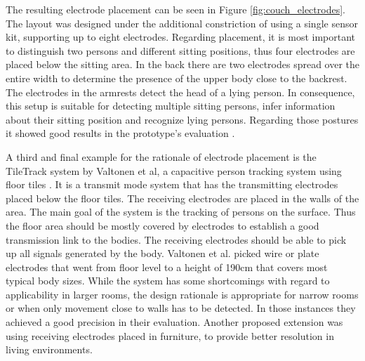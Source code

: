 The resulting electrode placement can be seen in Figure \ref{fig:couch_electrodes}. The layout was designed under the additional constriction of using a single sensor kit, supporting up to eight electrodes. Regarding placement, it is most important to distinguish two persons and different sitting positions, thus four electrodes are placed below the sitting area. In the back there are two electrodes spread over the entire width to determine the presence of the upper body close to the backrest. The electrodes in the armrests detect the head of a lying person. In consequence, this setup is suitable for detecting multiple sitting persons, infer information about their sitting position and recognize lying persons. Regarding those postures it showed good results in the prototype's evaluation \cite{Couch2011}.
 
A third and final example for the rationale of electrode placement is the TileTrack system by Valtonen et al, a capacitive person tracking system using floor tiles \cite{Valtonen2009a}. It is a transmit mode system that has the transmitting electrodes placed below the floor tiles. The receiving electrodes are placed in the walls of the area. The main goal of the system is the tracking of persons on the surface. Thus the floor area should be mostly covered by electrodes to establish a good transmission link to the bodies. The receiving electrodes should be able to pick up all signals generated by the body. Valtonen et al. picked wire or plate electrodes that went from floor level to a height of 190cm that covers most typical body sizes. While the system has some shortcomings with regard to applicability in larger rooms, the design rationale is appropriate for narrow rooms or when only movement close to walls has to be detected. In those instances they achieved a good precision in their evaluation. Another proposed extension was using receiving electrodes placed in furniture, to provide better resolution in living environments.

